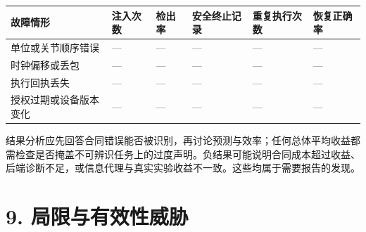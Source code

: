 \documentclass[
  chinese,
  11pt,
  a4paper,
  fontset=fandol]{ctexart}
\newcounter{none} %
\begin{document}
{\def\LTcaptype{none} %
\begin{longtable}[]{@{}
  >{\raggedright\arraybackslash}p{}
  >{\raggedleft\arraybackslash}p{}
  >{\raggedright\arraybackslash}p{}
  >{\raggedright\arraybackslash}p{}
  >{\raggedright\arraybackslash}p{}
  >{\raggedright\arraybackslash}p{}@{}}
\toprule\noalign{}
\begin{minipage}[b]{\linewidth}\raggedright
故障情形
\end{minipage} & \begin{minipage}[b]{\linewidth}\raggedleft
注入次数
\end{minipage} & \begin{minipage}[b]{\linewidth}\raggedright
检出率
\end{minipage} & \begin{minipage}[b]{\linewidth}\raggedright
安全终止记录
\end{minipage} & \begin{minipage}[b]{\linewidth}\raggedright
重复执行次数
\end{minipage} & \begin{minipage}[b]{\linewidth}\raggedright
恢复正确率
\end{minipage} \\
\midrule\noalign{}
\endhead
\bottomrule\noalign{}
\endlastfoot
单位或关节顺序错误 & --- & --- & --- & --- & --- \\
时钟偏移或丢包 & --- & --- & --- & --- & --- \\
执行回执丢失 & --- & --- & --- & --- & --- \\
授权过期或设备版本变化 & --- & --- & --- & --- & --- \\
\end{longtable}
}

结果分析应先回答合同错误能否被识别，再讨论预测与效率；任何总体平均收益都需检查是否掩盖不可辨识任务上的过度声明。负结果可能说明合同成本超过收益、后端诊断不足，或信息代理与真实实验收益不一致。这些均属于需要报告的发现。

\section{9.
局限与有效性威胁}\label{ux5c40ux9650ux4e0eux6709ux6548ux6027ux5a01ux80c1}
\end{document}

